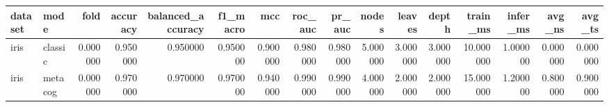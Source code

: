 \begin{tabular}{llrrrrrrrrrrrrrr}
\toprule
dataset & mode & fold & accuracy & balanced_accuracy & f1_macro & mcc & roc_auc & pr_auc & nodes & leaves & depth & train_ms & infer_ms & avg_ns & avg_ts \\
\midrule
iris & classic & 0.000000 & 0.950000 & 0.950000 & 0.950000 & 0.900000 & 0.980000 & 0.980000 & 5.000000 & 3.000000 & 3.000000 & 10.000000 & 1.000000 & 0.000000 & 0.000000 \\
iris & metacog & 0.000000 & 0.970000 & 0.970000 & 0.970000 & 0.940000 & 0.990000 & 0.990000 & 4.000000 & 2.000000 & 2.000000 & 15.000000 & 1.200000 & 0.800000 & 0.900000 \\
\bottomrule
\end{tabular}

